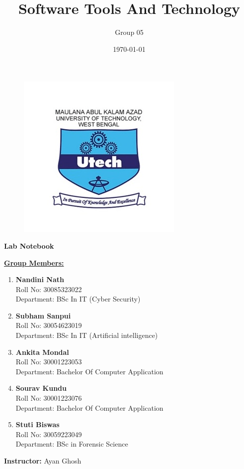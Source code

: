 \documentclass[12pt, a4paper]{article}
\title{\Huge \textbf{Software Tools And Technology}}
\author{Group 05}
\date{}
\begin{document}
\begin{figure}
    \centering
    \includegraphics[width=0.3\linewidth]{Makaut.png}
\end{figure}

\maketitle
{}


\begin{center}
    \vspace{-1.2cm}
    \LARGE\textbf{Lab Notebook}
\end{center}

\vspace{0.5cm}

\centering
\bfseries{\underline{Group Members:}}
\vspace{0.2cm}

\begin{enumerate}
    \item \textbf{Nandini Nath} \\
    Roll No: 30085323022 \\
    Department: BSc In IT (Cyber Security)
    
    \item \textbf{Subham Sanpui} \\
    Roll No: 30054623019\\
    Department: BSc In IT (Artificial intelligence)
    
    \item \textbf{Ankita Mondal} \\
    Roll No: 30001223053\\
    Department: Bachelor Of Computer Application
    
    \item \textbf{Sourav Kundu} \\
    Roll No: 30001223076 \\
    Department: Bachelor Of Computer Application
    
    \item \textbf{Stuti Biswas} \\
    Roll No: 30059223049 \\
    Department: BSc in Forensic Science
\end{enumerate}

\vspace{0.8cm}
\textbf{Instructor:} Ayan Ghosh \\
\date{\today}
\end{document}
